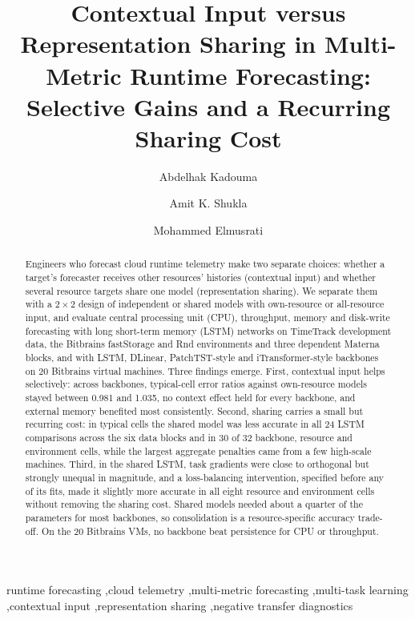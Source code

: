 \documentclass[5p,twocolumn]{elsarticle}
\begin{document}
\begin{frontmatter}

\title{Contextual Input versus Representation Sharing in Multi-Metric Runtime Forecasting: Selective Gains and a Recurring Sharing Cost}

\author[uva]{Abdelhak Kadouma}
\author[uva,sau]{Amit K. Shukla}
\author[uva]{Mohammed Elmusrati}



\begin{abstract}
Engineers who forecast cloud runtime telemetry make two separate choices:
whether a target's forecaster receives other resources' histories (contextual
input) and whether several resource targets share one model (representation
sharing). We separate them with a $2\times2$ design of independent or shared
models with own-resource or all-resource input, and evaluate central
processing unit (CPU), throughput, memory and disk-write forecasting with long
short-term memory (LSTM) networks on TimeTrack development data, the
Bitbrains fastStorage and Rnd environments and three dependent Materna
blocks, and with LSTM, DLinear, PatchTST-style and iTransformer-style
backbones on 20 Bitbrains virtual machines. Three findings emerge. First,
contextual input helps selectively: across backbones, typical-cell error
ratios against own-resource models stayed between 0.981 and 1.035, no context
effect held for every backbone, and external memory benefited most
consistently. Second, sharing carries a small but recurring cost: in typical
cells the shared model was less accurate in all 24 LSTM comparisons across the six data blocks
and in 30 of 32 backbone, resource and environment cells, while the largest
aggregate penalties came from a few high-scale machines. Third, in the shared
LSTM, task gradients were close to orthogonal but strongly unequal in
magnitude, and a loss-balancing intervention, specified before any of its
fits, made it slightly more accurate in all eight resource and environment cells without removing
the sharing cost.
Shared models needed about a quarter of the parameters for most backbones,
so consolidation is a resource-specific accuracy trade-off. On the 20
Bitbrains VMs, no backbone beat persistence for CPU or throughput.
\end{abstract}

\begin{keyword}
runtime forecasting \sep cloud telemetry \sep multi-metric forecasting \sep multi-task learning \sep contextual input \sep representation sharing \sep negative transfer diagnostics
\end{keyword}

\end{frontmatter}
\end{document}
